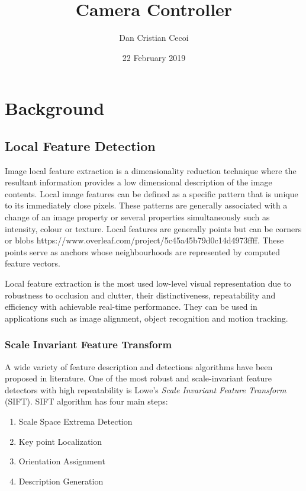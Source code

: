 \documentclass{l4proj}
\begin{document}
\title{Camera Controller}
\author{Dan Cristian Cecoi}
\date{22 February 2019}

\maketitle


\chapter{Background}

\section{Local Feature Detection}

Image local feature extraction is a dimensionality reduction technique where the resultant information provides a low dimensional description of the image contents. Local image features can be defined as a specific pattern that is unique to its immediately close pixels. These patterns are generally associated with a change of an image property or several properties simultaneously such as intensity, colour or texture. Local features are generally points but can be corners or blobs https://www.overleaf.com/project/5c45a45b79d0c14d4973ffff\citep{Tinne08}. These points serve as anchors whose neighbourhoods are represented by computed feature vectors. 

Local feature extraction is the most used low-level visual representation due to robustness to occlusion and clutter, their distinctiveness, repeatability and efficiency with achievable real-time performance. They can be used in applications such as image alignment, object recognition and motion tracking.   


\subsection{Scale Invariant Feature Transform}

A wide variety of feature description and detections algorithms have been proposed in literature. One of the most robust and scale-invariant feature detectors with high repeatability is Lowe's \textit{Scale Invariant Feature Transform} (SIFT). SIFT algorithm has four main steps:





\begin{enumerate}
  \item Scale Space Extrema Detection
  \item Key point Localization
  \item Orientation Assignment
  \item Description Generation 
\end{enumerate}
\end{document}
